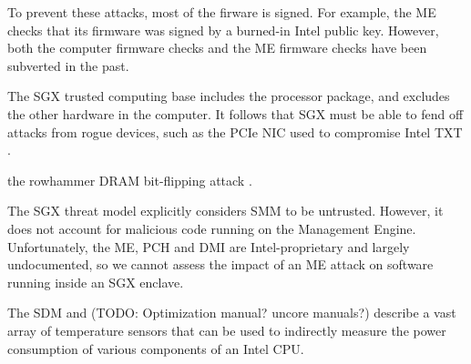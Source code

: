 To prevent these attacks, most of the firware is signed. For example, the ME
checks that its firmware was signed by a burned-in Intel public key. However,
both the computer firmware checks \cite{wojtczuk2010bios, furtak2014bios} and
the ME firmware checks \cite{tereshkin2009amt} have been subverted in the past.


The SGX trusted computing base includes the processor package, and excludes the
other hardware in the computer. It follows that SGX must be able to fend off
attacks from rogue devices, such as the PCIe NIC used to compromise Intel TXT
\cite{wojtczuk2011txt}.


the rowhammer DRAM bit-flipping attack
\cite{kim2014rowhammer, google2015rowhammer, gruss2015rowhammer}.


The SGX threat model explicitly considers SMM to be untrusted. However, it does
not account for malicious code running on the Management Engine. Unfortunately,
the ME, PCH and DMI are Intel-proprietary and largely undocumented, so we
cannot assess the impact of an ME attack on software running inside an SGX
enclave.

The SDM and (TODO: Optimization manual? uncore manuals?) describe a vast array
of temperature sensors that can be used to indirectly measure the power
consumption of various components of an Intel CPU.

